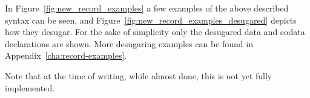 In Figure~\ref{fig:new_record_examples} a few examples of the above described
syntax can be seen, and Figure~\ref{fig:new_record_examples_desugared} depicts how
they desugar. For the sake of simplicity only the desugared data and codata
declarations are shown. More desugaring examples can be found in
Appendix~\ref{cha:record-examples}.

Note that at the time of writing, while almost done, this is not yet fully
implemented.

